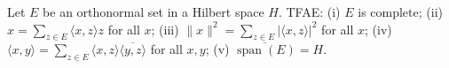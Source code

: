Let $E$ be an orthonormal set in a Hilbert space $H$. TFAE: (i) $E$ is complete; (ii) $x = \sum_{z \in E} \langle x, z \rangle z$ for all $x$; (iii) $\|x\|^2 = \sum_{z \in E} |\langle x, z \rangle|^2$ for all $x$; (iv) $\langle x, y \rangle = \sum_{z \in E} \langle x, z \rangle \overline{\langle y, z \rangle}$ for all $x,y$; (v) $\overline{\operatorname{span}(E)} = H$.
